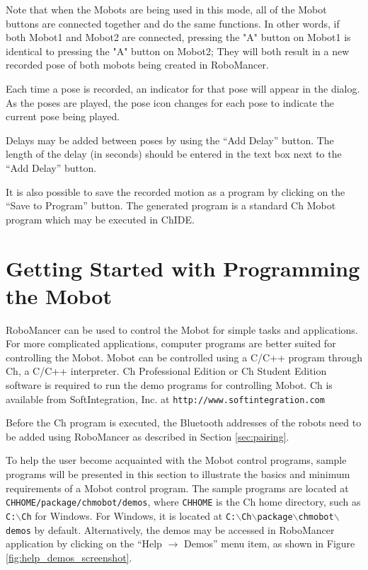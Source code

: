 \documentclass{article}
\begin{document}
Note that when the Mobots are being used in this mode, all of the Mobot buttons are
connected together and do the same functions. In other words, if both Mobot1 and Mobot2 are connected, pressing the "A" button
on Mobot1 is identical to pressing the "A" button on Mobot2; They will both result
in a new recorded pose of both mobots being created in RoboMancer.

Each time a pose is recorded, an indicator for that pose will appear in the dialog. As the
poses are played, the pose icon changes for each pose to indicate the current pose being played.

Delays may be added between poses by using the ``Add Delay'' button. The length of the delay (in seconds)
should be entered in the text box next to the ``Add Delay'' button.

It is also possible to save the recorded motion as a program by clicking on the ``Save to Program'' 
button. The generated program is a standard Ch Mobot program which may be executed 
in ChIDE. 

\section{Getting Started with Programming the Mobot}
RoboMancer can be used to control the Mobot for simple tasks and applications.
For more complicated applications, computer programs are better suited for controlling
the Mobot.
Mobot can be controlled using a C/C++ program through Ch, a C/C++ interpreter.
Ch Professional Edition or Ch Student Edition software is required to run the
demo programs for controlling Mobot. Ch is available from SoftIntegration, Inc. at
\texttt{http://www.softintegration.com}

Before the Ch program is executed, the Bluetooth addresses of the robots
need to be added using RoboMancer as described in Section \ref{sec:pairing}.

To help the user become acquainted with the Mobot control programs, sample
programs will be presented in this section to illustrate the basics and minimum requirements of
a Mobot control program. The sample programs are located at
\texttt{CHHOME/package/chmobot/demos}, where \texttt{CHHOME} is the
Ch home directory, such as \texttt{C:$\backslash$Ch} for Windows. For Windows,
it is located at \texttt{C:$\backslash$Ch$\backslash$package$\backslash$chmobot$\backslash$demos} by default.
Alternatively, the demos may be accessed in RoboMancer application
by clicking on the ``Help $\rightarrow$ Demos'' menu item, as shown in Figure
\ref{fig:help_demos_screenshot}.
\end{document}
